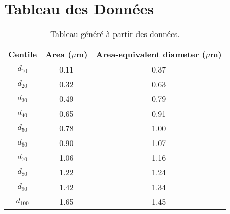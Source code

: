 \documentclass[a4paper]{article}
\begin{document}
\section*{Tableau des Données}
\begin{table}[h!]
\centering
\begin{tabular}{|c|c|c|}
\hline
Centile & Area ($\mu$m) & Area-equivalent diameter ($\mu$m) \\
\hline

$d_{10}$ & 0.11 & 0.37 \\
$d_{20}$ & 0.32 & 0.63 \\
$d_{30}$ & 0.49 & 0.79 \\
$d_{40}$ & 0.65 & 0.91 \\
$d_{50}$ & 0.78 & 1.00 \\
$d_{60}$ & 0.90 & 1.07 \\
$d_{70}$ & 1.06 & 1.16 \\
$d_{80}$ & 1.22 & 1.24 \\
$d_{90}$ & 1.42 & 1.34 \\
$d_{100}$ & 1.65 & 1.45 \\
\hline
\end{tabular}
\caption{Tableau généré à partir des données.}
\end{table}
\end{document}
